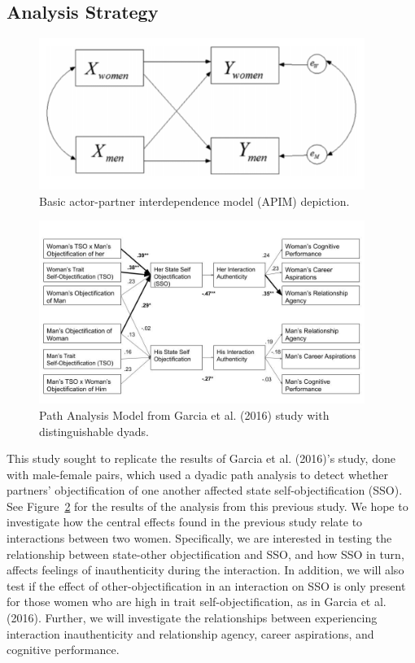 \documentclass[man]{apa6}
\begin{document}
\subsection{Analysis Strategy}\label{analysis-strategy}

\begin{figure}
\includegraphics[width=400px]{APIM_figure} \caption{Basic actor-partner interdependence model (APIM) depiction.}\label{fig:apim}
\end{figure}

\begin{figure}
\includegraphics[width=400px]{2016_figure} \caption{Path Analysis Model from Garcia et al. (2016) study with distinguishable dyads.}\label{fig:2016figure}
\end{figure}

This study sought to replicate the results of Garcia et al. (2016)'s
study, done with male-female pairs, which used a dyadic path analysis to
detect whether partners' objectification of one another affected state
self-objectification (SSO). See Figure~\ref{fig:2016figure} for the
results of the analysis from this previous study. We hope to investigate
how the central effects found in the previous study relate to
interactions between two women. Specifically, we are interested in
testing the relationship between state-other objectification and SSO,
and how SSO in turn, affects feelings of inauthenticity during the
interaction. In addition, we will also test if the effect of
other-objectification in an interaction on SSO is only present for those
women who are high in trait self-objectification, as in Garcia et al.
(2016). Further, we will investigate the relationships between
experiencing interaction inauthenticity and relationship agency, career
aspirations, and cognitive performance.
\end{document}
